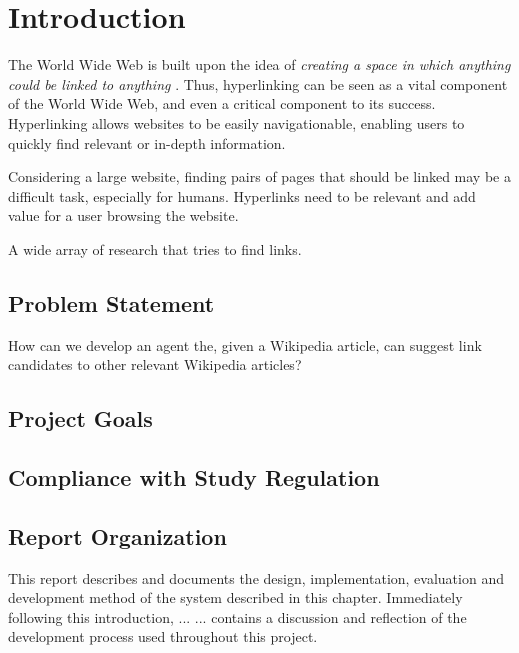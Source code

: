 \chapter{Introduction}
The World Wide Web is built upon the idea of \emph{creating a space in which anything could be linked to anything} \cite[ch.~1, p.~4]{Weaving-the-web}. Thus, hyperlinking can be seen as a vital component of the World Wide Web, and even a critical component to its success. Hyperlinking allows websites to be easily navigationable, enabling users to quickly find relevant or in-depth information.

Considering a large website, finding pairs of pages that should be linked may be a difficult task, especially for humans. Hyperlinks need to be relevant and add value for a user browsing the website.

A wide array of research that tries to find links.


\section{Problem Statement}
How can we develop an agent the, given a Wikipedia article, can suggest link candidates to other relevant Wikipedia articles?

\section{Project Goals}

\section{Compliance with Study Regulation}

\section{Report Organization}
This report describes and documents the design, implementation, evaluation and development method of the system described in this chapter. Immediately following this introduction,  ... \dummy ...  contains a discussion and reflection of the development process used throughout this project.